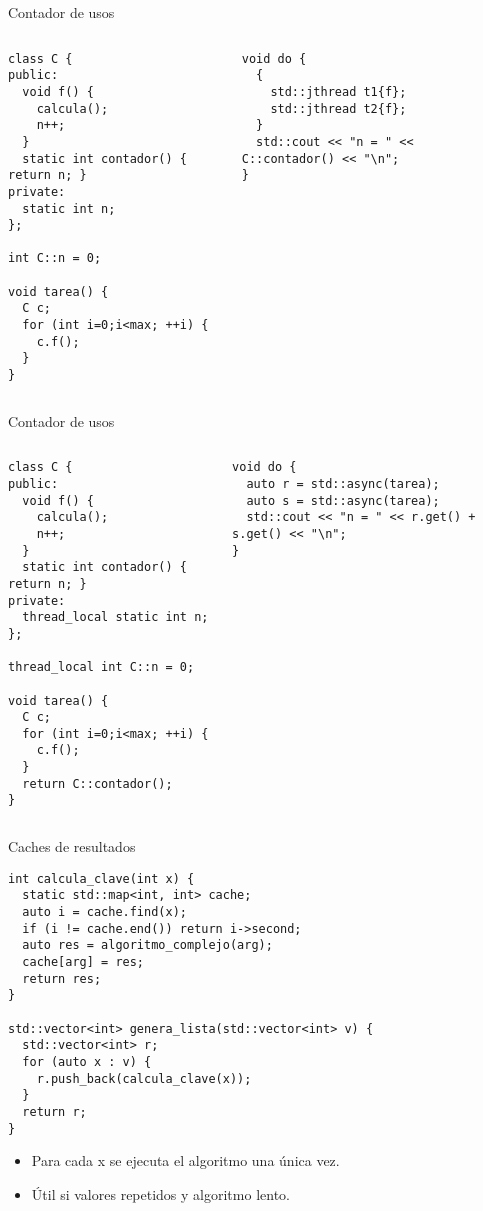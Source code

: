 \begin{frame}[t,fragile]{Contador de usos}
\begin{columns}[T]

\begin{lstlisting}
class C {
public:
  void f() {
    calcula();
    n++;
  }
  static int contador() { return n; }
private:
  static int n;
};

int C::n = 0;

void tarea() {
  C c;
  for (int i=0;i<max; ++i) {
    c.f();
  }
}
\end{lstlisting}

\pause

\begin{lstlisting}
void do {
  {
    std::jthread t1{f}; 
    std::jthread t2{f};
  }
  std::cout << "n = " << C::contador() << "\n";
}
\end{lstlisting}
\end{columns}
\end{frame}

\begin{frame}[t,fragile]{Contador de usos}
\begin{columns}[T]
\begin{lstlisting}
class C {
public:
  void f() {
    calcula();
    n++;
  }
  static int contador() { return n; }
private:
  thread_local static int n;
};

thread_local int C::n = 0;

void tarea() {
  C c;
  for (int i=0;i<max; ++i) {
    c.f();
  }
  return C::contador();
}
\end{lstlisting}

\pause

\begin{lstlisting}
void do {
  auto r = std::async(tarea);
  auto s = std::async(tarea);
  std::cout << "n = " << r.get() + s.get() << "\n";
}
\end{lstlisting}
\end{columns}
\end{frame}

\begin{frame}[t,fragile]{Caches de resultados}
\begin{lstlisting}
int calcula_clave(int x) {
  static std::map<int, int> cache;
  auto i = cache.find(x);
  if (i != cache.end()) return i->second;
  auto res = algoritmo_complejo(arg);
  cache[arg] = res;
  return res;
}

std::vector<int> genera_lista(std::vector<int> v) {
  std::vector<int> r;
  for (auto x : v) {
    r.push_back(calcula_clave(x));
  }
  return r;
}
\end{lstlisting}
\begin{itemize}
  \item Para cada x se ejecuta el algoritmo una única vez.
  \item Útil si valores repetidos y algoritmo lento.
\end{itemize}
\end{frame}

